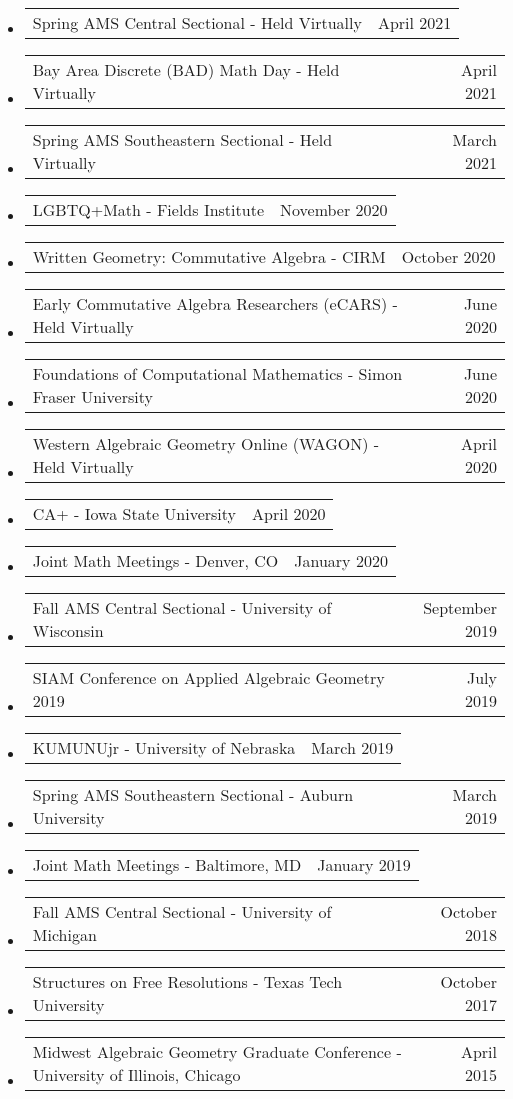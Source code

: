 \documentclass[letterpaper,11pt]{article}
\makeatletter
\newcommand{\ressubheadingTalk}[2]{
\begin{tabular*}{6.5in}[t]{l@{\cftdotfill{\cftsecdotsep}\extracolsep{\fill}}r}
		#1 & #2 \\
\end{tabular*}\vspace{-6pt}}
\makeatother
\begin{document}
\begin{itemize}
\item
	\ressubheadingTalk{Spring AMS Central Sectional - Held Virtually}{April 2021}
	
\item
	\ressubheadingTalk{Bay Area Discrete (BAD) Math Day - Held Virtually}{April 2021}
	
\item
	\ressubheadingTalk{Spring AMS Southeastern Sectional - Held Virtually}{March 2021}
	
\item
	\ressubheadingTalk{LGBTQ+Math - Fields Institute}{November 2020}

\item
	\ressubheadingTalk{Written Geometry: Commutative Algebra - CIRM}{October 2020}\footnotemark[2]
		
\item
	\ressubheadingTalk{Early Commutative Algebra Researchers (eCARS) - Held Virtually}{June 2020}

\item
	\ressubheadingTalk{Foundations of Computational Mathematics - Simon Fraser University}{June 2020}\footnotemark[2]

\item
	\ressubheadingTalk{Western Algebraic Geometry Online (WAGON) - Held Virtually}{April 2020}
	
\item
	\ressubheadingTalk{CA+ - Iowa State University}{April 2020}\footnotemark[2]

\item
	\ressubheadingTalk{Joint Math Meetings - Denver, CO}{January 2020}
	
\item
	\ressubheadingTalk{Fall AMS Central Sectional - University of Wisconsin }{September 2019}
	
\item
	\ressubheadingTalk{SIAM Conference on Applied Algebraic Geometry 2019}{July 2019}
	
\item
	\ressubheadingTalk{KUMUNUjr - University of Nebraska}{March 2019}
	
\item
	\ressubheadingTalk{Spring AMS Southeastern Sectional - Auburn University}{March 2019}
	
\item
	\ressubheadingTalk{Joint Math Meetings - Baltimore, MD}{January 2019}
	
\item
	\ressubheadingTalk{Fall AMS Central Sectional - University of Michigan}{October 2018}
	
\item
	\ressubheadingTalk{Structures on Free Resolutions - Texas Tech University}{October 2017}

\item
	\ressubheadingTalk{Midwest Algebraic Geometry Graduate Conference - University of Illinois, Chicago}{April 2015}
	
\end{itemize}
\end{document}
